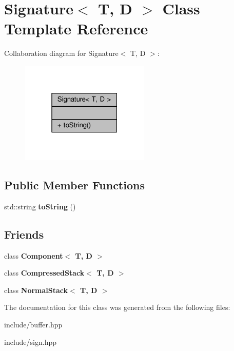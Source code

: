 \hypertarget{class_signature}{}\section{Signature$<$ T, D $>$ Class Template Reference}
\label{class_signature}


Collaboration diagram for Signature$<$ T, D $>$\+:
\nopagebreak
\begin{figure}[H]
\begin{center}
\leavevmode
\includegraphics[width=175pt]{class_signature__coll__graph}
\end{center}
\end{figure}
\subsection*{Public Member Functions}
\begin{DoxyCompactItemize}
\item 
std\+::string {\bfseries to\+String} ()\hypertarget{class_signature_a3fab31cb17d15768ad94e697cbe6674d}{}\label{class_signature_a3fab31cb17d15768ad94e697cbe6674d}

\end{DoxyCompactItemize}
\subsection*{Friends}
\begin{DoxyCompactItemize}
\item 
class {\bfseries Component$<$ T, D $>$}\hypertarget{class_signature_a843c2f068a1ab99ce6c9c0e2cc3946c5}{}\label{class_signature_a843c2f068a1ab99ce6c9c0e2cc3946c5}

\item 
class {\bfseries Compressed\+Stack$<$ T, D $>$}\hypertarget{class_signature_a0bc563c952d4b72ba232305ab7717bd9}{}\label{class_signature_a0bc563c952d4b72ba232305ab7717bd9}

\item 
class {\bfseries Normal\+Stack$<$ T, D $>$}\hypertarget{class_signature_a3448f5e6d9366f8729b55e62587568ca}{}\label{class_signature_a3448f5e6d9366f8729b55e62587568ca}

\end{DoxyCompactItemize}


The documentation for this class was generated from the following files\+:\begin{DoxyCompactItemize}
\item 
include/buffer.\+hpp\item 
include/sign.\+hpp\end{DoxyCompactItemize}
